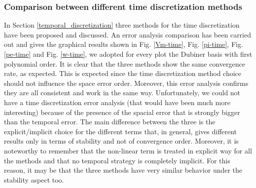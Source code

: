 \documentclass[a4paper,11pt]{article}
\begin{document}
\subsubsection{Comparison between different time discretization methods}
In Section \ref{temporal_discretization} three methods for the time discretization have been proposed and discussed. An error analysis comparison has been carried out and gives the graphical results shown in Fig. \ref{Vm-time}, Fig. \ref{pi-time}, Fig. \ref{pe-time} and Fig. \ref{w-time}, we adopted for every plot the Dubiner basis with first polynomial order.
\noindent It is clear that the three methods show the same convergence rate, as expected. This is expected since the time discretization method choice should not influence the space error order. Moreover, this error analysis confirms they are all consistent and work in the same way. Unfortunately, we could not have a time discretization error analysis (that would have been much more interesting) because of the presence of the spacial error that is strongly bigger than the temporal error. The main difference between the three is the explicit/implicit choice for the different terms that, in general, gives different results only in terms of stability and not of convergence order. Moreover, it is noteworthy to remember that the non-linear term is treated in explicit way for all the methods and that no temporal strategy is completely implicit. For this reason, it may be that the three methods have very similar behavior under the stability aspect too.
\end{document}
